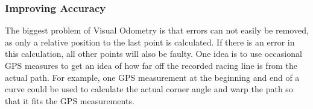 \subsubsection{Improving Accuracy}
The biggest problem of Visual Odometry is that errors can not easily be removed, as only a relative position to the last point is calculated. If there is an error in this calculation, all other points will also be faulty. One idea is to use occasional GPS measures to get an idea of how far off the recorded racing line is from the actual path. For example, one GPS measurement at the beginning and end of a curve could be used to calculate the actual corner angle and warp the path so that it fits the GPS measurements. 

\clearpage